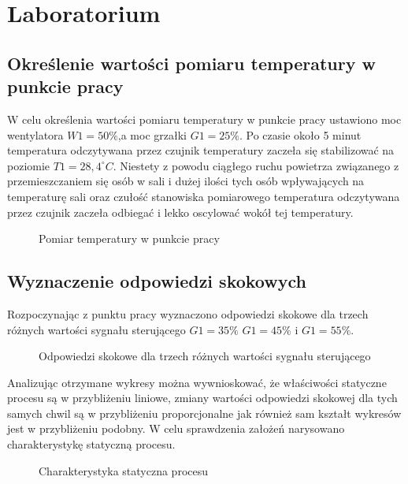 \chapter{Laboratorium}

\section{Określenie wartości pomiaru temperatury w punkcie pracy}

W celu określenia wartości pomiaru temperatury w punkcie pracy ustawiono moc wentylatora  $W1 = 50\%$,a moc grzałki $G1 = 25\%$.
Po czasie około 5 minut temperatura odczytywana przez czujnik temperatury zaczeła się stabilizować  na poziomie  $T1 = 28,4^{\circ} C$. 
Niestety z powodu ciągłego ruchu powietrza związanego z przemieszczaniem się osób w sali i dużej ilości tych osób wpływających na temperaturę sali oraz czułość stanowiska pomiarowego temperatura odczytywana przez czujnik zaczeła odbiegać i lekko oscylować wokół tej temperatury.

\begin{figure}[H]
\centering

\caption{Pomiar temperatury w punkcie pracy}
\end{figure}

\section{Wyznaczenie odpowiedzi skokowych}

Rozpoczynając z punktu pracy wyznaczono odpowiedzi skokowe dla trzech różnych wartości sygnału sterującego  $G1 = 35\%$  $G1 = 45\%$ i $G1 = 55\%$.

\begin{figure}[H]
\centering

\caption{Odpowiedzi skokowe dla trzech różnych wartości sygnału sterującego}
\end{figure}

Analizując otrzymane wykresy można wywnioskować, że właściwości statyczne procesu są w przybliżeniu liniowe, zmiany wartości odpowiedzi skokowej dla tych samych chwil są w przybliżeniu proporcjonalne jak również sam kształt wykresów jest w przybliżeniu podobny. W celu sprawdzenia założeń narysowano charakterystykę statyczną procesu.

\begin{figure}[H]
\centering

\caption{Charakterystyka statyczna procesu}
\end{figure}

